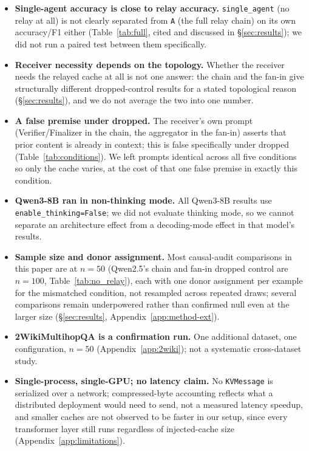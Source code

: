 \documentclass[11pt]{article}
\begin{document}
\begin{itemize}[leftmargin=*]
\item \textbf{Single-agent accuracy is close to relay accuracy.}
\texttt{single\_agent} (no relay at all) is not clearly separated from
\texttt{A} (the full relay chain) on its own accuracy/F1 either
(Table~\ref{tab:full}, cited and discussed in \S\ref{sec:results});
we did not run a paired test between them specifically.
\item \textbf{Receiver necessity depends on the topology.} Whether the
receiver needs the relayed cache at all is not one answer: the chain
and the fan-in give structurally different dropped-control results for
a stated topological reason (\S\ref{sec:results}), and we do not
average the two into one number.
\item \textbf{A false premise under dropped.} The receiver's own prompt
(Verifier/Finalizer in the chain, the aggregator in the fan-in) asserts
that prior content is already in context; this is false specifically
under dropped (Table~\ref{tab:conditions}). We left prompts identical
across all five conditions so only the cache varies, at the cost of
that one false premise in exactly this condition.
\item \textbf{Qwen3-8B ran in non-thinking mode.} All Qwen3-8B results
use \texttt{enable\_thinking=False}; we did not evaluate thinking mode,
so we cannot separate an architecture effect from a decoding-mode
effect in that model's results.
\item \textbf{Sample size and donor assignment.} Most causal-audit
comparisons in this paper are at $n=50$ (Qwen2.5's chain and fan-in
dropped control are $n=100$, Table~\ref{tab:no_relay}), each with one
donor assignment per example for the mismatched condition, not
resampled across repeated draws; several comparisons remain
underpowered rather than confirmed null even at the larger size
(\S\ref{sec:results}, Appendix~\ref{app:method-ext}).
\item \textbf{2WikiMultihopQA is a confirmation run.} One additional
dataset, one configuration, $n=50$ (Appendix~\ref{app:2wiki}); not a
systematic cross-dataset study.
\item \textbf{Single-process, single-GPU; no latency claim.} No
\texttt{KVMessage} is serialized over a network; compressed-byte
accounting reflects what a distributed deployment would need to send,
not a measured latency speedup, and smaller caches are not observed to
be faster in our setup, since every transformer layer still runs
regardless of injected-cache size (Appendix~\ref{app:limitations}).

\end{itemize}
\end{document}
